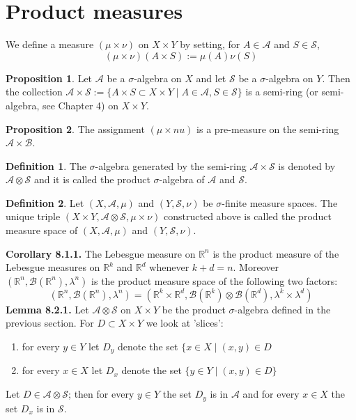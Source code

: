 \documentclass[a4paper,14pt]{extarticle}
\theoremstyle{definition}
\newtheorem{definition}{Definition}
\newtheorem{proposition}{Proposition}
\begin{document}
\section{Product measures}
We define a measure $(\mu\times\nu)$ on $X\times Y$ by setting, for $A\in\mathcal{A}$ and $S\in\mathcal{S}$,
\[(\mu\times\nu)(A\times S):=\mu(A)\nu(S)\]
\begin{proposition}
  Let $\mathcal{A}$ be a $\sigma$-algebra on $X$ and let $\mathcal{S}$ be a $\sigma$-algebra on $Y$. Then the collection $\mathcal{A}\times\mathcal{S}:=\{A\times S\subset X\times Y\mid A\in\mathcal{A}, S\in\mathcal{S}\}$ is a semi-ring (or semi-algebra, see Chapter 4) on $X\times Y$.
\end{proposition}
\begin{proposition}
  The assignment $(\mu\times nu)$ is a pre-measure on the semi-ring $\mathcal{A}\times\mathcal{B}$.
\end{proposition}
\begin{definition}
  The $\sigma$-algebra generated by the semi-ring $\mathcal{A}\times\mathcal{S}$ is denoted by $\mathcal{A}\otimes\mathcal{S}$ and it is called the product $\sigma$-algebra of $\mathcal{A}$ and $\mathcal{S}$.
\end{definition}
\begin{definition}
  Let $(X,\mathcal{A},\mu)$ and $(Y,\mathcal{S},\nu)$ be $\sigma$-finite measure spaces. The unique triple $(X\times Y,\mathcal{A}\otimes\mathcal{S},\mu\times\nu)$ constructed above is called the product measure space of $(X,\mathcal{A},\mu)$ and $(Y,\mathcal{S},\nu)$.
\end{definition}
\noindent\textbf{Corollary 8.1.1.} The Lebesgue measure on $\mathbb{R}^n$ is the product measure of the Lebesgue measures on $\mathbb{R}^k$ and $\mathbb{R}^d$ whenever $k+d=n$. Moreover $(\mathbb{R}^n,\mathcal{B}(\mathbb{R}^n),\lambda^n)$ is the product measure space of the following two factors:
\[(\mathbb{R}^n,\mathcal{B}(\mathbb{R}^n),\lambda^n)=(\mathbb{R}^k\times\mathbb{R}^d,\mathcal{B}(\mathbb{R}^k)\otimes\mathcal{B}(\mathbb{R}^d),\lambda^k\times\lambda^d)\]
\noindent\textbf{Lemma 8.2.1.} Let $\mathcal{A}\otimes\mathcal{S}$ on $X\times Y$ be the product $\sigma$-algebra defined in the previous section. For $D\subset X\times Y$ we look at 'slices':
\begin{enumerate}
  \item for every $y\in Y$ let $D_y$ denote the set $\{x\in X\mid(x,y)\in D$
  \item for every $x\in X$ let $D_x$ denote the set $\{y\in Y\mid (x,y)\in D\}$
\end{enumerate}
Let $D\in\mathcal{A}\otimes\mathcal{S}$; then for every $y\in Y$ the set $D_y$ is in $\mathcal{A}$ and for every $x\in X$ the set $D_x$ is in $\mathcal{S}$.
\end{document}
